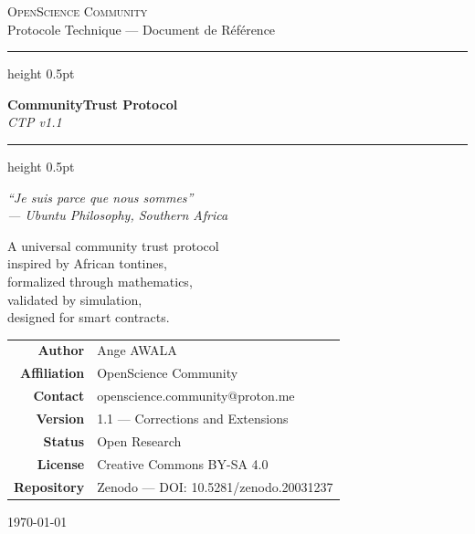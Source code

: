 \documentclass[12pt,a4paper]{article}
\theoremstyle{definition}
\theoremstyle{plain}
\theoremstyle{remark}
\newcommand{\1}{\mathbf{1}}
\begin{document}
\begin{titlepage}
\centering
\vspace*{1.5cm}

{\Large \textsc{OpenScience Community}}\\[0.4cm]
{\small Protocole Technique — Document de Référence}\\[2cm]

\hrule height 0.5pt
\vspace{0.6cm}

{\Huge \textbf{CommunityTrust Protocol}}\\[0.5cm]
{\LARGE \textit{CTP v1.1}}\\[0.3cm]

\vspace{0.4cm}
\hrule height 0.5pt
\vspace{1.2cm}

{\large \textit{``Je suis parce que nous sommes''}}\\[0.2cm]
{\small \textit{--- Ubuntu Philosophy, Southern Africa}}

\vspace{1.5cm}

{\large A universal community trust protocol\\
inspired by African tontines,\\
formalized through mathematics,\\
validated by simulation,\\
designed for smart contracts.}

\vspace{1.5cm}

\begin{tabular}{rl}
\textbf{Author}       & Ange AWALA \\
\textbf{Affiliation}  & OpenScience Community \\
\textbf{Contact}      & openscience.community@proton.me \\[0.3cm]
\textbf{Version}      & 1.1 --- Corrections and Extensions \\
\textbf{Status}       & Open Research \\
\textbf{License}      & Creative Commons BY-SA 4.0 \\
\textbf{Repository}   & Zenodo --- DOI: 10.5281/zenodo.20031237 \\
\end{tabular}

\vfill
{\small \today}
\end{titlepage}
\end{document}
